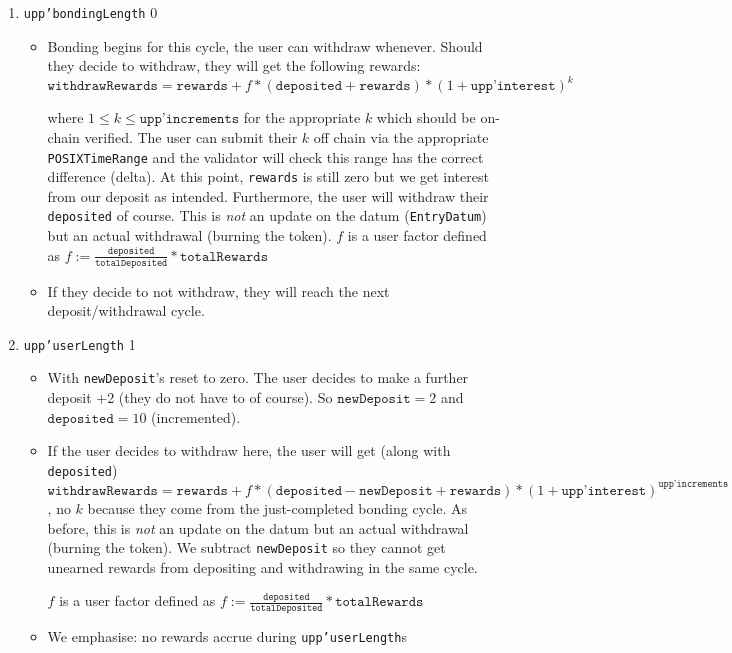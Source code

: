 \documentclass[10pt, a4paper]{article}
\theoremstyle{definition}
\begin{document}
\begin{enumerate}
{\begin{itemize}
\end{itemize}
}

\item{\texttt{upp'bondingLength} 0
\begin{itemize}
\item{Bonding begins for this cycle, the user can withdraw whenever. Should they decide to withdraw, they will get the following rewards: \\ $\texttt{withdrawRewards} = \texttt{rewards} + f* (\texttt{deposited} + \texttt{rewards})* (1 + \texttt{upp'interest})^k$

 where $1 \leq k \leq \texttt{upp'increments}$
for the appropriate $k$ which should be on-chain verified. The user can submit their $k$ off chain via the appropriate \texttt{POSIXTimeRange} and the validator will check this range has the correct difference (delta). At this point, \texttt{rewards} is still zero but we get interest from our deposit as intended. Furthermore, the user will withdraw their \texttt{deposited} of course. This is \textit{not} an update on the datum (\texttt{EntryDatum}) but an actual withdrawal (burning the token). $f$ is a user factor defined as $f := \frac{\texttt{deposited}}{\texttt{totalDeposited}} * \texttt{totalRewards}$}
\item{If they decide to not withdraw, they will reach the next deposit/withdrawal cycle.}
\end{itemize}
}

\item{\texttt{upp'userLength} 1
\begin{itemize}
\item{With \texttt{newDeposit}'s reset to zero. The user decides to make a further deposit +2 (they do not have to of course). So $\texttt{newDeposit}=2$ and $\texttt{deposited}=10$ (incremented).}
\item{If the user decides to withdraw here, the user will get (along with \texttt{deposited}) \\ $\texttt{withdrawRewards} = \texttt{rewards} +  f * (\texttt{deposited} - \texttt{newDeposit} + \texttt{rewards})* (1 + \texttt{upp'interest})^\texttt{upp'increments}$, no $k$ because they come from the just-completed  bonding cycle. As before, this is \textit{not} an update on the datum but an actual withdrawal (burning the token). We subtract \texttt{newDeposit} so they cannot get unearned rewards from depositing and withdrawing in the same cycle.

$f$ is a user factor defined as $f := \frac{\texttt{deposited}}{\texttt{totalDeposited}} * \texttt{totalRewards}$
}
\item{We emphasise: no rewards accrue during \texttt{upp'userLength}s}
\end{itemize}
}



\end{enumerate}
\end{document}
